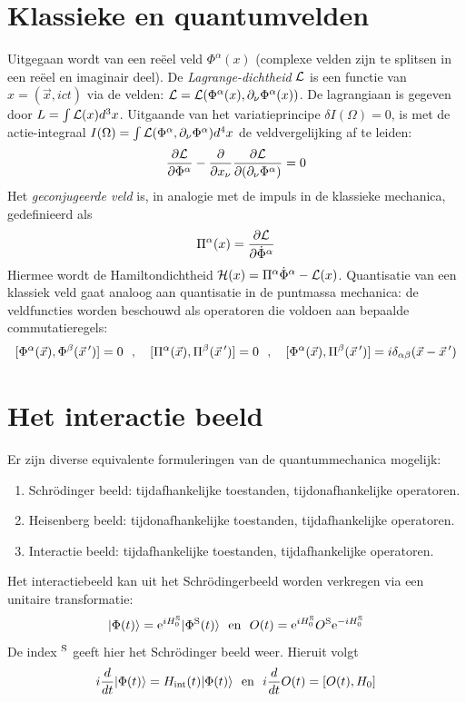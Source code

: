 \documentclass[twoside]{report}
\begin{document}
\section[~~Klassieke en quantumvelden]{Klassieke en quantumvelden}
Uitgegaan wordt van een re\"eel veld $\Phi^\alpha(x)$ (complexe velden zijn
te splitsen in een re\"eel en imaginair deel). De {\it Lagrange-dichtheid}
${\cal L}$ is een functie van $x=(\vec{x},ict)$ via de velden:
${\cal L}={\cal L}(\Phi^\alpha(x),\partial_\nu\Phi^\alpha(x))$. De lagrangiaan is
gegeven door $L=\int{\cal L}(x)d^3x$. Uitgaande van het variatieprincipe
$\delta I(\Omega)=0$, is met de actie-integraal
$I(\Omega)=\int{\cal L}(\Phi^\alpha,\partial_\nu\Phi^\alpha)d^4x$
de veldvergelijking af te leiden:
\[
\frac{\partial {\cal L}}{\partial \Phi^\alpha}-\frac{\partial }{\partial x_\nu}\frac{\partial {\cal L}}{\partial (\partial_\nu\Phi^\alpha)}=0
\]
Het {\it geconjugeerde veld} is, in analogie met de impuls in de klassieke
mechanica, gedefinieerd als
\[
\Pi^\alpha(x)=\frac{\partial {\cal L}}{\partial \dot{\Phi}^\alpha}
\]
Hiermee wordt de Hamiltondichtheid ${\cal H}(x)=\Pi^\alpha\dot{\Phi}^\alpha-{\cal L}(x)$.
\npar
Quantisatie van een klassiek veld gaat analoog aan quantisatie in de
puntmassa mechanica: de veldfuncties worden beschouwd als operatoren die
voldoen aan bepaalde commutatieregels:
\[
[\Phi^\alpha(\vec{x}),\Phi^\beta(\vec{x}\,')]=0~~,~~~
[\Pi^\alpha(\vec{x}),\Pi^\beta(\vec{x}\,')]=0~~,~~~
[\Phi^\alpha(\vec{x}),\Pi^\beta(\vec{x}\,')]=i\delta_{\alpha\beta}(\vec{x}-\vec{x}\,')
\]

\section[~~Het interactie beeld]{Het interactie beeld}
Er zijn diverse equivalente formuleringen van de quantummechanica mogelijk:
\begin{enumerate}
\item Schr\"odinger beeld: tijdafhankelijke toestanden, tijdonafhankelijke operatoren.
\item Heisenberg beeld: tijdonafhankelijke toestanden, tijdafhankelijke operatoren.
\item Interactie beeld: tijdafhankelijke toestanden, tijdafhankelijke operatoren.
\end{enumerate}
Het interactiebeeld kan uit het Schr\"odingerbeeld worden verkregen via een
unitaire transformatie:
\[
|\Phi(t)\rangle={\rm e}^{iH_0^{\rm S}}|\Phi^{\rm S}(t)\rangle~~\mbox{en}~~
O(t)={\rm e}^{iH_0^{\rm S}}O^{\rm S}{\rm e}^{-iH_0^{\rm S}}
\]
De index $^{\rm S}$ geeft hier het Schr\"odinger beeld weer. Hieruit volgt
\[
i\frac{d}{dt}|\Phi(t)\rangle=H_{\rm int}(t)|\Phi(t)\rangle~~\mbox{en}~~
i\frac{d}{dt}O(t)=[O(t),H_0]
\]
\end{document}
